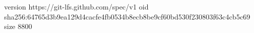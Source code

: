 version https://git-lfs.github.com/spec/v1
oid sha256:64765d3b9ea129d4cacfe4fb0534b8ecb8be9cf60bd530f230803f63c4cb5c69
size 8800
